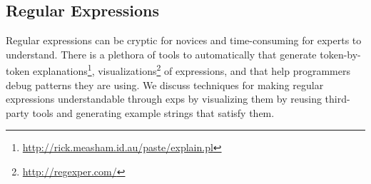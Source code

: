 \begin{figure}
\end{figure}

\subsection{Regular Expressions}

\begin{changes}
Regular expressions can be cryptic for novices and time-consuming for experts to understand.
There is a plethora of tools to automatically that generate token-by-token explanations\footnote{\url{http://rick.measham.id.au/paste/explain.pl}}, visualizations\footnote{\url{http://regexper.com/}} of expressions, and that help programmers debug patterns they are using.
We discuss techniques for making regular expressions understandable through \glspl{exp} by visualizing them by reusing third-party tools and generating example strings that satisfy them.
\end{changes}

